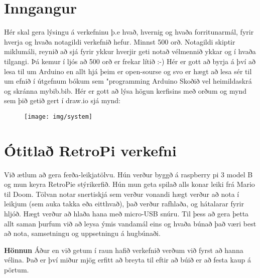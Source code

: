 \section{Inngangur}
Hér skal gera lýsingu á verkefninu þ.e hvað,  hvernig og  hvaða forritunarmál, fyrir hverja og hvaða notagildi verkefnið hefur. Minnst 500 orð. Notagildi skiptir miklumáli, reynið að sjá fyrir ykkur hverjir geti notað vélmennið ykkar og í hvaða tilgangi.  Þá kemur í ljós að 500 orð er frekar lítið :-) Hér er gott að byrja á því að lesa til um Arduino en allt hjá þeim er open-sourse og svo er hægt að lesa sér til um efnið í útgefnum bókum sem "programming Arduino \cite{monk} Skoðið vel heimildaskrá og skránna mybib.bib. Hér er gott að lýsa högun kerfisins með orðum og mynd sem þið getið gert í draw.io sjá mynd:
\begin{figure}[h]
\texttt{[image: img/system]}
\end{figure}
\section{Ótitlað RetroPi verkefni}
Við ætlum að gera ferða-leikjatölvu. Hún verður byggð á raspberry pi 3 model B og mun keyra RetroPie stýrikerfið. Hún mun geta spilað alls konar leiki frá Mario til Doom. Tölvan notar snertiskjá sem verður vonandi hægt verður að nota í leikjum (sem auka takka eða eitthvað), það verður rafhlaða, og hátalarar fyrir hljóð. Hægt verður að hlaða hana með micro-USB snúru. Til þess að gera þetta allt saman þurfum við að leysa ýmis vandamál eins og hvaða búnað það væri best að nota, samsetningu og uppsetningu á hugbúnaði.

\textbf{Hönnun}
Áður en við getum í raun hafið verkefnið verðum við fyrst að hanna vélina. Það er því miður mjög erfitt að breyta til eftir að búið er að festa kaup á pörtum.